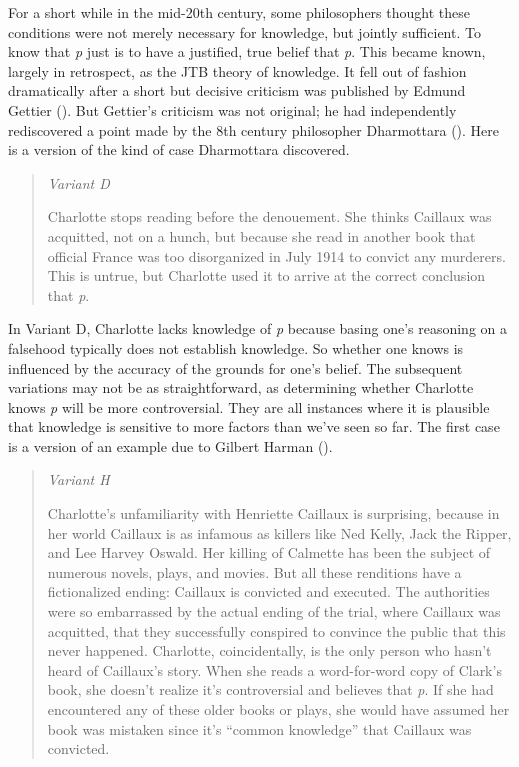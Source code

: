\documentclass[
  10pt,
  letterpaper,
  twoside]{scrbook}
\begin{document}
For a short while in the mid-20th century, some philosophers thought
these conditions were not merely necessary for knowledge, but jointly
sufficient. To know that \emph{p} just is to have a justified, true
belief that \emph{p}. This became known, largely in retrospect, as the
JTB theory of knowledge. It fell out of fashion dramatically after a
short but decisive criticism was published by Edmund Gettier
(). But Gettier's criticism was not
original; he had independently rediscovered a point made by the 8th
century philosopher Dharmottara ().
Here is a version of the kind of case Dharmottara discovered.

\begin{quote}
\emph{Variant D}

Charlotte stops reading before the denouement. She thinks Caillaux was
acquitted, not on a hunch, but because she read in another book that
official France was too disorganized in July 1914 to convict any
murderers. This is untrue, but Charlotte used it to arrive at the
correct conclusion that \emph{p}.
\end{quote}

In Variant D, Charlotte lacks knowledge of \emph{p} because basing one's
reasoning on a falsehood typically does not establish knowledge. So
whether one knows is influenced by the accuracy of the grounds for one's
belief. The subsequent variations may not be as straightforward, as
determining whether Charlotte knows \emph{p} will be more controversial.
They are all instances where it is plausible that knowledge is sensitive
to more factors than we've seen so far. The first case is a version of
an example due to Gilbert Harman ().

\begin{quote}
\emph{Variant H}

Charlotte's unfamiliarity with Henriette Caillaux is surprising, because
in her world Caillaux is as infamous as killers like Ned Kelly, Jack the
Ripper, and Lee Harvey Oswald. Her killing of Calmette has been the
subject of numerous novels, plays, and movies. But all these renditions
have a fictionalized ending: Caillaux is convicted and executed. The
authorities were so embarrassed by the actual ending of the trial, where
Caillaux was acquitted, that they successfully conspired to convince the
public that this never happened. Charlotte, coincidentally, is the only
person who hasn't heard of Caillaux's story. When she reads a
word-for-word copy of Clark's book, she doesn't realize it's
controversial and believes that \emph{p}. If she had encountered any of
these older books or plays, she would have assumed her book was mistaken
since it's ``common knowledge'' that Caillaux was convicted.
\end{quote}
\end{document}
